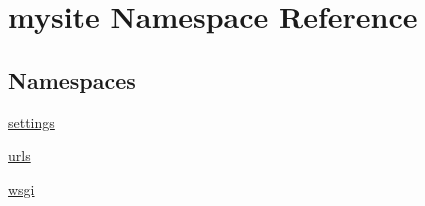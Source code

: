 \hypertarget{namespacemysite}{}\section{mysite Namespace Reference}
\label{namespacemysite}
\subsection*{Namespaces}
\begin{DoxyCompactItemize}
\item 
 \hyperlink{namespacemysite_1_1settings}{settings}
\item 
 \hyperlink{namespacemysite_1_1urls}{urls}
\item 
 \hyperlink{namespacemysite_1_1wsgi}{wsgi}
\end{DoxyCompactItemize}
